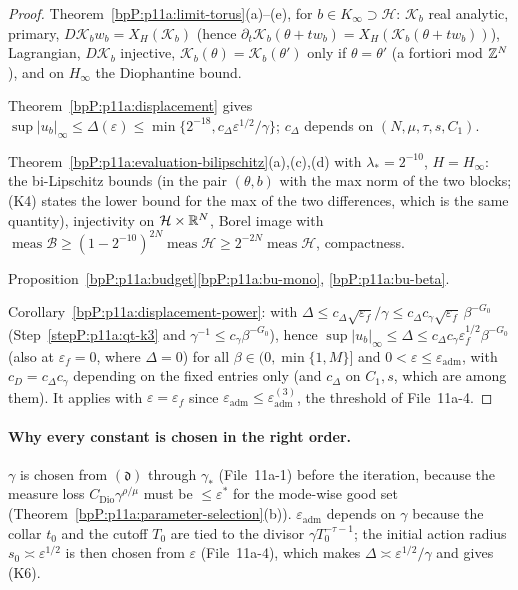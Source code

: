 \begin{proof}
\label{stepP:p11a:qt-k2} Theorem~\ref{bpP:p11a:limit-torus}(a)--(e), for $b\in K_\infty\supset\mathcal H$: $\mathcal K_b$ real analytic, primary, $D\mathcal K_b w_b=X_H(\mathcal K_b)$ (hence $\partial_t\mathcal K_b(\theta+tw_b)=X_H(\mathcal K_b(\theta+tw_b))$), Lagrangian, $D\mathcal K_b$ injective, $\mathcal K_b(\theta)=\mathcal K_b(\theta')$ only if $\theta=\theta'$ (a fortiori mod $\mathbb{Z}^N$), and on $H_\infty$ the Diophantine bound.

\label{stepP:p11a:qt-k3} Theorem~\ref{bpP:p11a:displacement} gives $\sup\lvert u_b\rvert_\infty\le\Delta(\varepsilon)\le\min\{2^{-18},c_\Delta\varepsilon^{1/2}/\gamma\}$; $c_\Delta$ depends on $(N,\mu,\tau,s,C_1)$.

\label{stepP:p11a:qt-k4} Theorem~\ref{bpP:p11a:evaluation-bilipschitz}(a),(c),(d) with $\lambda_*=2^{-10}$, $H=H_\infty$: the bi-Lipschitz bounds (in the pair $(\theta,b)$ with the max norm of the two blocks; (K4) states the lower bound for the max of the two differences, which is the same quantity), injectivity on $\mathcal H\times\mathbb{R}^N$, Borel image with $\operatorname{meas}\mathcal B\ge(1-2^{-10})^{2N}\operatorname{meas}\mathcal H\ge2^{-2N}\operatorname{meas}\mathcal H$, compactness.

\label{stepP:p11a:qt-k5} Proposition~\ref{bpP:p11a:budget}\ref{bpP:p11a:bu-mono}, \ref{bpP:p11a:bu-beta}.

\label{stepP:p11a:qt-k6} Corollary~\ref{bpP:p11a:displacement-power}: with $\Delta\le c_\Delta\sqrt{\varepsilon_f}/\gamma\le c_\Delta c_\gamma\sqrt{\varepsilon_f}\,\beta^{-G_0}$ (Step~\ref{stepP:p11a:qt-k3} and $\gamma^{-1}\le c_\gamma\beta^{-G_0}$), hence $\sup\lvert u_b\rvert_\infty\le\Delta\le c_\Delta c_\gamma\varepsilon_f^{1/2}\beta^{-G_0}$ (also at $\varepsilon_f=0$, where $\Delta=0$) for all $\beta\in(0,\min\{1,M\}]$ and $0<\varepsilon\le\varepsilon_{\mathrm{adm}}$, with $c_D=c_\Delta c_\gamma$ depending on the fixed entries only (and $c_\Delta$ on $C_1,s$, which are among them). It applies with $\varepsilon=\varepsilon_f$ since $\varepsilon_{\mathrm{adm}}\le\varepsilon^{(3)}_{\mathrm{adm}}$, the threshold of File~11a-4.
\end{proof}

\paragraph{Why every constant is chosen in the right order.} $\gamma$ is chosen from $(\mathfrak d)$ through $\gamma_*$ (File~11a-1) before the iteration, because the measure loss $C_{\mathrm{Dio}}\gamma^{\rho/\mu}$ must be $\le\varepsilon^*$ for the mode-wise good set (Theorem~\ref{bpP:p11a:parameter-selection}(b)). $\varepsilon_{\mathrm{adm}}$ depends on $\gamma$ because the collar $t_0$ and the cutoff $T_0$ are tied to the divisor $\gamma T_0^{-\tau-1}$; the initial action radius $s_0\asymp\varepsilon^{1/2}$ is then chosen from $\varepsilon$ (File~11a-4), which makes $\Delta\asymp\varepsilon^{1/2}/\gamma$ and gives (K6).

